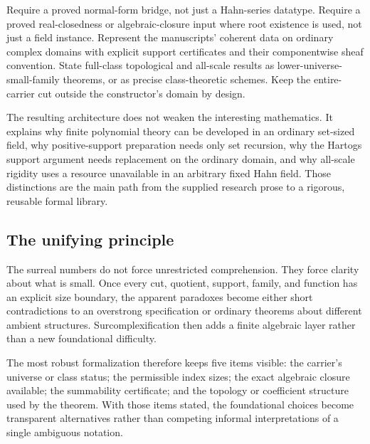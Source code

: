 \documentclass[11pt,letterpaper]{article}
\numberwithin{equation}{section}
\theoremstyle{definition}
\theoremstyle{remark}
\begin{document}
Require a proved normal-form bridge, not just a Hahn-series datatype. Require a proved real-closedness or algebraic-closure input where root existence is used, not just a field instance. Represent the manuscripts' coherent data on ordinary complex domains with explicit support certificates and their componentwise sheaf convention. State full-class topological and all-scale results as lower-universe-small-family theorems, or as precise class-theoretic schemes. Keep the entire-carrier cut outside the constructor's domain by design.

The resulting architecture does not weaken the interesting mathematics. It explains why finite polynomial theory can be developed in an ordinary set-sized field, why positive-support preparation needs only set recursion, why the Hartogs support argument needs replacement on the ordinary domain, and why all-scale rigidity uses a resource unavailable in an arbitrary fixed Hahn field. Those distinctions are the main path from the supplied research prose to a rigorous, reusable formal library.

\subsection{The unifying principle}
The surreal numbers do not force unrestricted comprehension. They force clarity about what is small. Once every cut, quotient, support, family, and function has an explicit size boundary, the apparent paradoxes become either short contradictions to an overstrong specification or ordinary theorems about different ambient structures. Surcomplexification then adds a finite algebraic layer rather than a new foundational difficulty.

The most robust formalization therefore keeps five items visible: the carrier's universe or class status; the permissible index sizes; the exact algebraic closure available; the summability certificate; and the topology or coefficient structure used by the theorem. With those items stated, the foundational choices become transparent alternatives rather than competing informal interpretations of a single ambiguous notation.

\appendix
\end{document}

